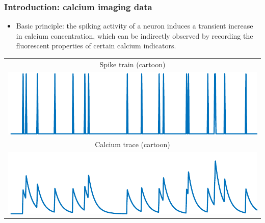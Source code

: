 \documentclass[16pt,presentation]{beamer}
\begin{document}
\begin{frame}
\frametitle{Introduction: calcium imaging data}
\begin{itemize}
\item Basic principle: the \alert{spiking} activity of a neuron induces a transient increase in \alert{calcium concentration}, which can be indirectly observed by recording the \alert{fluorescent properties} of certain calcium indicators.
\end{itemize}
\begin{center}
{\scriptsize
\begin{tabular}[t]{c}
  Spike train (cartoon) \\
\includegraphics[scale=0.4,clip = true]{figs/ROI_cartoon/fig_cartoon_spike_1.pdf}\\
Calcium trace (cartoon) \\
\includegraphics[scale=0.4,clip = true]{figs/ROI_cartoon/fig_cartoon_calcium_1.pdf}
\end{tabular}
}
\end{center}
\end{frame}
\end{document}
